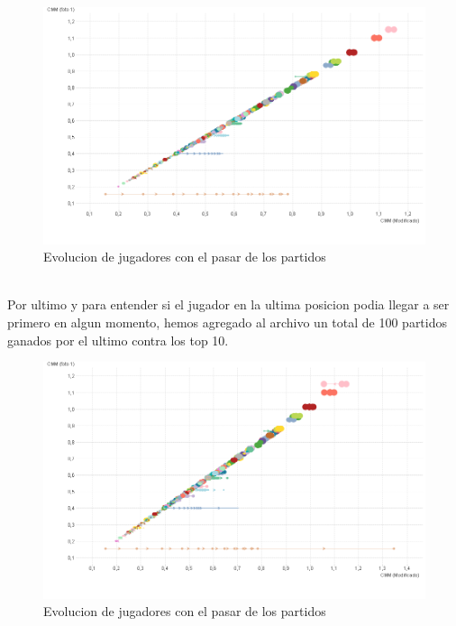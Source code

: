 \begin{figure}[H]
\centering
\includegraphics[width=1\textwidth]{IMG/comparativa cmm -cmm foto 10.png}
\caption{Evolucion de jugadores con el pasar de los partidos}
\label{fig:Evolucion de jugadores con el pasar de los partidos}
\end{figure}

\\
Por ultimo y para entender si el jugador en la ultima posicion podia llegar a ser primero en algun momento, hemos agregado al archivo un total de 100 partidos ganados por el ultimo contra 
los top 10.
\\

\begin{figure}[H]
\centering
\includegraphics[width=1\textwidth]{IMG/comparativa cmm -cmm foto 100.png}
\caption{Evolucion de jugadores con el pasar de los partidos}
\label{fig:Evolucion de jugadores con el pasar de los partidos}
\end{figure}


